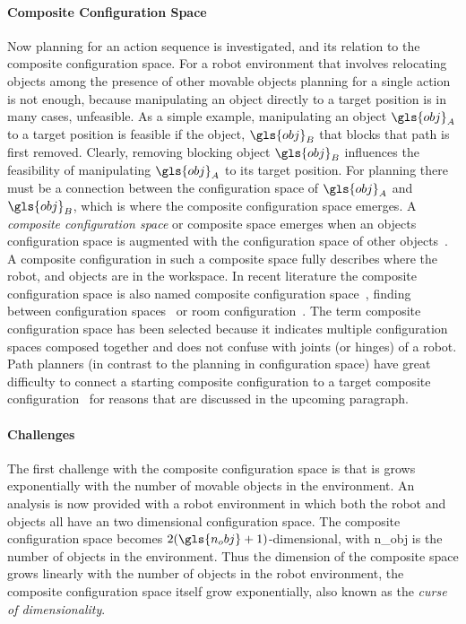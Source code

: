 \paragraph{Composite Configuration Space}
Now planning for an action sequence is investigated, and its relation to the composite configuration space. For a robot environment that involves relocating objects among the presence of other movable objects planning for a single action is not enough, because manipulating an object directly to a target position is in many cases, unfeasible. As a simple example, manipulating an object $\gls{obj}_A$ to a target position is feasible if the object, $\gls{obj}_B$ that blocks that path is first removed. Clearly, removing blocking object $\gls{obj}_B$ influences the feasibility of manipulating $\gls{obj}_A$ to its target position. For planning there must be a connection between the configuration space of $\gls{obj}_A$ and $\gls{obj}_B$, which is where the composite configuration space emerges. A \textit{composite configuration space} or composite space emerges when an objects configuration space is augmented with the configuration space of other objects~\cite{vandenberg_path_2009}. A composite configuration in such a composite space fully describes where the robot, and objects are in the workspace. In recent literature the composite configuration space is also named composite configuration space~\cite{vega-brown_asymptotically_2020}, finding  between configuration spaces~\cite{hauser_multimodal_2010} or room configuration~\cite{sabbaghnovin_model_2021}. The term composite configuration space has been selected because it indicates multiple configuration spaces composed together and does not confuse with joints (or hinges) of a robot. Path planners (in contrast to the planning in configuration space) have great difficulty to connect a starting composite configuration to a target composite configuration~\cite{roynicholas_hierarchy_2021} for reasons that are discussed in the upcoming paragraph.\bs

\paragraph{Challenges}
The first challenge with the composite configuration space is that is grows exponentially with the number of movable objects in the environment. An analysis is now provided with a robot environment in which both the robot and objects all have an two dimensional configuration space. The composite configuration space becomes $2(\gls{n_obj}+1)$-dimensional, with \gls{n_obj} is the number of objects in the environment. Thus the dimension of the composite space grows linearly with the number of objects in the robot environment, the composite configuration space itself grow exponentially, also known as the \textit{curse of dimensionality}.\bs

